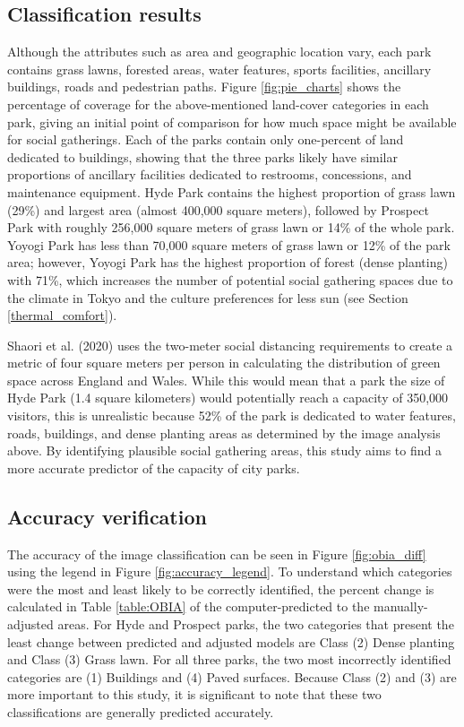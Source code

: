 \begin{multicols}{2}

\subsection{Classification results}
Although the attributes such as area and geographic location vary, each park contains grass lawns, forested areas, water features, sports facilities, ancillary buildings, roads and pedestrian paths. Figure \ref{fig:pie_charts} shows the percentage of coverage for the above-mentioned land-cover categories in each park, giving an initial point of comparison for how much space might be available for social gatherings. Each of the parks contain only one-percent of land dedicated to buildings, showing that the three parks likely have similar proportions of ancillary facilities dedicated to restrooms, concessions, and maintenance equipment. Hyde Park contains the highest proportion of grass lawn (29\%) and largest area (almost 400,000 square meters), followed by Prospect Park with roughly 256,000 square meters of grass lawn or 14\% of the whole park. Yoyogi Park has less than 70,000 square meters of grass lawn or 12\% of the park area; however, Yoyogi Park has the highest proportion of forest (dense planting) with 71\%, which increases the number of potential social gathering spaces due to the climate in Tokyo and the culture preferences for less sun (see Section \ref{thermal_comfort}). 

Shaori et al. (2020) uses the two-meter social distancing requirements to create a metric of four square meters per person in calculating the distribution of green space across England and Wales. While this would mean that a park the size of Hyde Park (1.4 square kilometers) would potentially reach a capacity of 350,000 visitors, this is unrealistic because 52\% of the park is dedicated to water features, roads, buildings, and dense planting areas as determined by the image analysis above. By identifying plausible social gathering areas, this study aims to find a more accurate predictor of the capacity of city parks. 

\subsection{Accuracy verification}
The accuracy of the image classification can be seen in Figure \ref{fig:obia_diff} using the legend in Figure \ref{fig:accuracy_legend}. To understand which categories were the most and least likely to be correctly identified, the percent change is calculated in Table \ref{table:OBIA} of the computer-predicted to the manually-adjusted areas. For Hyde and Prospect parks, the two categories that present the least change between predicted and adjusted models are Class (2) Dense planting and Class (3) Grass lawn. For all three parks, the two most incorrectly identified categories are (1) Buildings and (4) Paved surfaces. Because Class (2) and (3) are more important to this study, it is significant to note that these two classifications are generally predicted accurately.  


\end{multicols}
